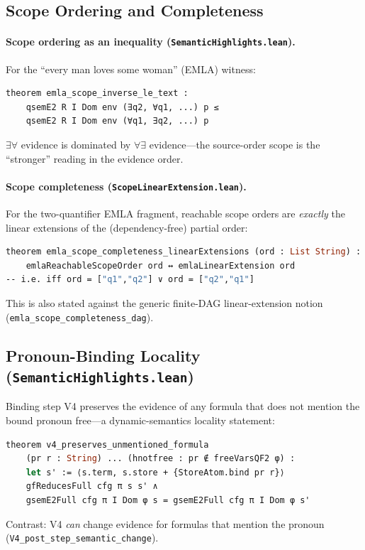 \documentclass[11pt]{article}
\newcommand{\code}[1]{\texttt{#1}}
\begin{document}
\subsection{Scope Ordering and Completeness}

\paragraph{Scope ordering as an inequality (\code{SemanticHighlights.lean}).}
For the ``every man loves some woman'' (EMLA) witness:
\begin{lstlisting}[language=ml]
theorem emla_scope_inverse_le_text :
    qsemE2 R I Dom env (∃q2, ∀q1, ...) p ≤
    qsemE2 R I Dom env (∀q1, ∃q2, ...) p
\end{lstlisting}
$\exists\forall$ evidence is dominated by $\forall\exists$ evidence---the
source-order scope is the ``stronger'' reading in the evidence order.

\paragraph{Scope completeness (\code{ScopeLinearExtension.lean}).}
For the two-quantifier EMLA fragment, reachable scope orders are
\emph{exactly} the linear extensions of the (dependency-free) partial order:
\begin{lstlisting}[language=ml]
theorem emla_scope_completeness_linearExtensions (ord : List String) :
    emlaReachableScopeOrder ord ↔ emlaLinearExtension ord
-- i.e. iff ord = ["q1","q2"] ∨ ord = ["q2","q1"]
\end{lstlisting}
This is also stated against the generic finite-DAG linear-extension notion
(\code{emla\_scope\_completeness\_dag}).

\subsection{Pronoun-Binding Locality (\code{SemanticHighlights.lean})}

Binding step V4 preserves the evidence of any formula that does not
mention the bound pronoun free---a dynamic-semantics locality statement:
\begin{lstlisting}[language=ml]
theorem v4_preserves_unmentioned_formula
    (pr r : String) ... (hnotfree : pr ∉ freeVarsQF2 φ) :
    let s' := ⟨s.term, s.store + {StoreAtom.bind pr r}⟩
    gfReducesFull cfg π s s' ∧
    gsemE2Full cfg π I Dom φ s = gsemE2Full cfg π I Dom φ s'
\end{lstlisting}
Contrast: V4 \emph{can} change evidence for formulas that mention the pronoun
(\code{V4\_post\_step\_semantic\_change}).
\end{document}
